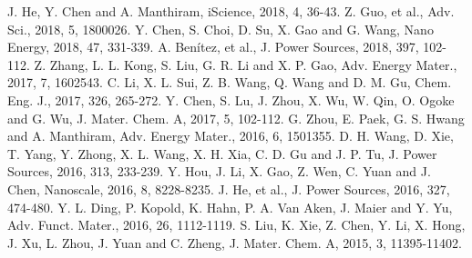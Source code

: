 \documentclass[12pt,a4paper,twocolumn]{article} %
\newcommand{\english}[1]{\textenglish{#1}}
\begin{document}
\begin{thebibliography}{99}
 \english{J. He, Y. Chen and A. Manthiram, iScience, 2018, 4, 36-43.}
 \english{Z. Guo, et al., Adv. Sci., 2018, 5, 1800026.}
 \english{Y. Chen, S. Choi, D. Su, X. Gao and G. Wang, Nano Energy, 2018, 47, 331-339.}
 \english{A. Benítez, et al., J. Power Sources, 2018, 397, 102-112.}
 \english{Z. Zhang, L. L. Kong, S. Liu, G. R. Li and X. P. Gao, Adv. Energy Mater., 2017, 7, 1602543.}
 \english{C. Li, X. L. Sui, Z. B. Wang, Q. Wang and D. M. Gu, Chem. Eng. J., 2017, 326, 265-272.}
 \english{Y. Chen, S. Lu, J. Zhou, X. Wu, W. Qin, O. Ogoke and G. Wu, J. Mater. Chem. A, 2017, 5, 102-112.}
 \english{G. Zhou, E. Paek, G. S. Hwang and A. Manthiram, Adv. Energy Mater., 2016, 6, 1501355.}
 \english{D. H. Wang, D. Xie, T. Yang, Y. Zhong, X. L. Wang, X. H. Xia, C. D. Gu and J. P. Tu, J. Power Sources, 2016, 313, 233-239.}
 \english{Y. Hou, J. Li, X. Gao, Z. Wen, C. Yuan and J. Chen, Nanoscale, 2016, 8, 8228-8235.}
 \english{J. He, et al., J. Power Sources, 2016, 327, 474-480.}
 \english{Y. L. Ding, P. Kopold, K. Hahn, P. A. Van Aken, J. Maier and Y. Yu, Adv. Funct. Mater., 2016, 26, 1112-1119.}
 \english{S. Liu, K. Xie, Z. Chen, Y. Li, X. Hong, J. Xu, L. Zhou, J. Yuan and C. Zheng, J. Mater. Chem. A, 2015, 3, 11395-11402.}

\end{thebibliography}

\end{document}

